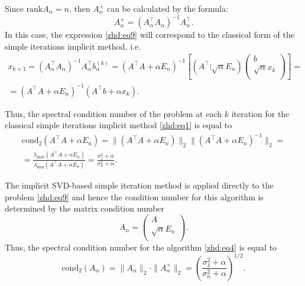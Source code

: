 Since $\mathrm{rank}A_{\alpha}=n$, then $A_{\alpha}^{+}$ can be calculated by the formula:
$$ 
A_{\alpha}^{+}=(A_{\alpha}^\top  A_{\alpha})^{-1}A_{\alpha}^\top . 
$$
In this case, the expression \eqref{zhd:eq9} will correspond to the classical form of the simple iterations implicit method, i.e.
\begin{multline*}
x_{k+1}=(A_{\alpha}^\top  A_{\alpha})^{-1}A_{\alpha}^\top  b_{\alpha}^{(k)}=
   (A^\top A+\alpha E_n)^{-1}\left[(A^\top  \vdots \sqrt{\alpha}E_n)\left(
                                                          \begin{array}{c}
                                                            b \\
                                                            \sqrt{\alpha}x_k \\
                                                          \end{array}
                                                        \right)\right]=  
                                                        \\
=(A^\top A+\alpha E_n)^{-1}(A^\top b+\alpha x_k). 
\end{multline*}

Thus, the spectral condition number of the problem at each $k$ iteration for the classical simple iterations implicit method \eqref{zhd:eq1} is equal to
\begin{multline*}
\mathrm{cond}_2(A^\top A+\alpha E_n)=\|(A^\top A+\alpha E_n)\|_2 \|(A^\top A+\alpha E_n)^{-1}\|_2=
\\
=\frac{\lambda_{\max}(A^\top A+\alpha E_n)}{\lambda_{\min}(A^\top A+\alpha E_n)}=\frac{\sigma_1^2+\alpha}{\sigma_n^2+\alpha}.
\end{multline*}

The implicit SVD-based simple iteration method is applied directly to the problem \eqref{zhd:eq9} and hence the condition number for this algorithm is determined by the matrix condition number
$$ 
A_\alpha=\left(\begin{array}{c}
                 A \\
                 \sqrt{\alpha}E_n  \\
                  \end{array}
                  \right).
$$
Thus, the spectral condition number for the algorithm \eqref{zhd:eq4} is equal to
$$ \mathrm{cond}_2(A_\alpha)=\|A_\alpha\|_2\cdot\|A^{+}_\alpha\|_2=
   \left(\frac{\sigma_1^2+\alpha}{\sigma_n^2+\alpha}\right)^{1/2}.
$$

